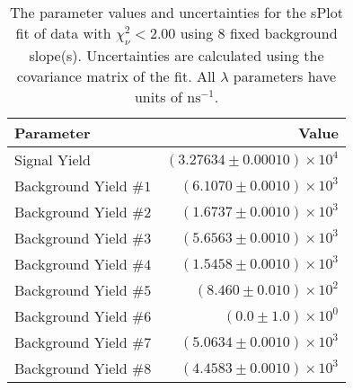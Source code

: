 
\begin{table}
    \begin{center}
        \begin{tabular}{lr}\toprule
            Parameter & Value \\\midrule
            Signal Yield & $(3.27634 \pm 0.00010) \times 10^{4}$ \\
            Background Yield $\#1$ & $(6.1070 \pm 0.0010) \times 10^{3}$ \\
            Background Yield $\#2$ & $(1.6737 \pm 0.0010) \times 10^{3}$ \\
            Background Yield $\#3$ & $(5.6563 \pm 0.0010) \times 10^{3}$ \\
            Background Yield $\#4$ & $(1.5458 \pm 0.0010) \times 10^{3}$ \\
            Background Yield $\#5$ & $(8.460 \pm 0.010) \times 10^{2}$ \\
            Background Yield $\#6$ & $(0.0 \pm 1.0) \times 10^{0}$ \\
            Background Yield $\#7$ & $(5.0634 \pm 0.0010) \times 10^{3}$ \\
            Background Yield $\#8$ & $(4.4583 \pm 0.0010) \times 10^{3}$ \\\bottomrule
        \end{tabular}
        \caption{The parameter values and uncertainties for the sPlot fit of data with $\chi^2_\nu < 2.00$ using 8 fixed background slope(s). Uncertainties are calculated using the covariance matrix of the fit. All $\lambda$ parameters have units of $\si{\nano\second}^{-1}$.}
    \end{center}
\end{table}
